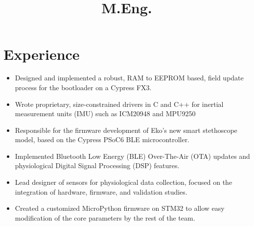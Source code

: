 \documentclass[11pt,letterpaper,sans]{moderncv}
\title{M.Eng.}                          %
\begin{document}
\makecvtitle
\vspace*{-15mm}
\small{ }
        
     \section{Experience}
     
        \vspace{-1pt}
        {
        \vspace{-1pt}
        \begin{itemize}
            \item Designed and implemented a robust, RAM to EEPROM based, field update process for the bootloader on a Cypress FX3.
            \item Wrote proprietary, size-constrained drivers in C and C++ for inertial measurement units (IMU) such as ICM20948 and MPU9250
        \end{itemize}
        } 
        
        \vspace{-1pt}
        {
        \vspace{-1pt}
        \begin{itemize}
            \item Responsible for the firmware development of Eko's new smart stethoscope model, based on the Cypress PSoC6 BLE microcontroller.
            \item Implemented Bluetooth Low Energy (BLE) Over-The-Air (OTA) updates and physiological Digital Signal Processing (DSP) features.
        \end{itemize}
        } 
        
        \vspace{-1pt}
        {
        \vspace{-1pt}
        \begin{itemize}
            \item Lead designer of sensors for physiological data collection, focused on the integration of hardware, firmware, and validation studies.
            \item Created a customized MicroPython firmware on STM32 to allow easy modification of the core parameters by the rest of the team.
        \end{itemize}
        }
        
\end{document}

